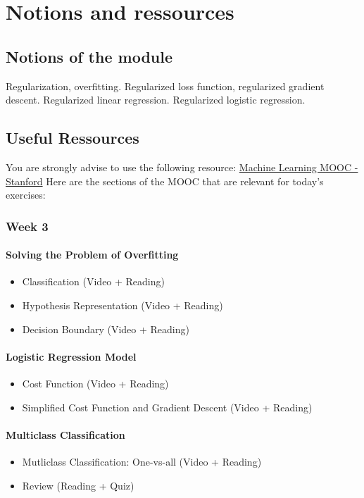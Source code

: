 

\chapter*{Notions and ressources}

\section*{Notions of the module}
Regularization, overfitting. Regularized loss function, regularized gradient descent.  
Regularized linear regression. Regularized logistic regression.

\section*{Useful Ressources}

You are strongly advise to use the following resource:
\href{https://www.coursera.org/learn/machine-learning/home/week/3}{Machine Learning MOOC - Stanford}
Here are the sections of the MOOC that are relevant for today's exercises: 

\subsection*{Week 3}

\subsubsection*{Solving the Problem of Overfitting}
\begin{itemize}
  \item Classification (Video + Reading)
  \item Hypothesis Representation (Video + Reading)
  \item Decision Boundary (Video + Reading)
\end{itemize}

\subsubsection*{Logistic Regression Model}
\begin{itemize}
  \item Cost Function (Video + Reading)
  \item Simplified Cost Function and Gradient Descent (Video + Reading)
\end{itemize}

\subsubsection*{Multiclass Classification}
\begin{itemize}
  \item Mutliclass Classification: One-vs-all (Video + Reading)
  \item Review (Reading + Quiz)
\end{itemize}
